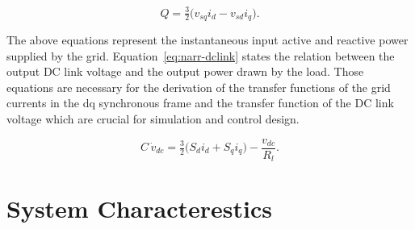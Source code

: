 \begin{equation}
\label{eq:narr-qe}
Q = \tfrac{3}{2} \big( v_{sq} i_d - v_{sd} i_q \big) .
\end{equation}





The above equations represent the instantaneous input active and reactive power supplied by the grid. Equation~\eqref{eq:narr-dclink} states the relation between the output DC link voltage and the output power drawn by the load. Those equations are necessary for the derivation of the transfer functions of the grid currents in the dq synchronous frame and the transfer function of the DC link voltage which are crucial for simulation and control design.



\begin{equation}
\label{eq:narr-dclink}
C\,\dot v_{dc} = \tfrac{3}{2} \big( S_d i_d + S_q i_q \big) - \frac{v_{dc}}{R_l} .
\end{equation}



























\section{System Characterestics}

